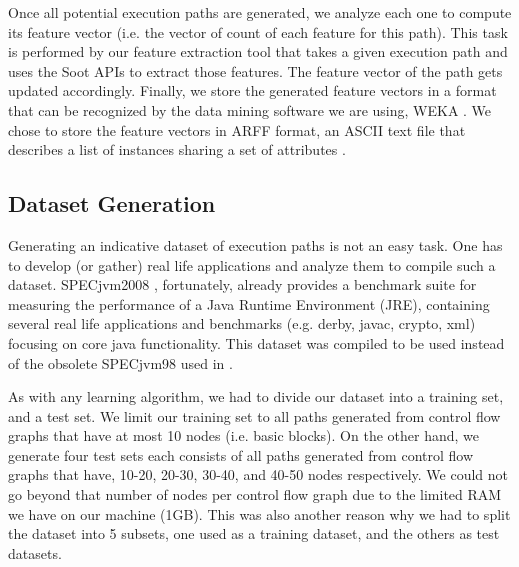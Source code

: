 \documentclass[10pt,twocolumn,letterpaper]{article}
\begin{document}
Once all potential execution paths are generated, we analyze each one to compute its feature vector (i.e. the vector of count of each feature for this path).
This task is performed by our feature extraction tool that takes a given execution path and uses the Soot \cite{vallee1999soot} APIs to extract those features.
The feature vector of the path gets updated accordingly. Finally, we store the generated feature vectors in a format that can be recognized by the data mining
software we are using, WEKA \cite{hall2009weka}. We chose to store the feature vectors in ARFF format, an ASCII text file that describes a list of instances
sharing a set of attributes \cite{arff}.

\subsection{Dataset Generation}
\label{dataset-generation}
Generating an indicative dataset of execution paths is not an easy task. One has to develop (or gather) real life applications and analyze them to compile such
a dataset. SPECjvm2008 \cite{specjvm2008}, fortunately, already provides a benchmark suite for measuring the performance of a Java Runtime Environment (JRE),
containing several real life applications and benchmarks (e.g. derby, javac, crypto, xml) focusing on core java functionality. This dataset was compiled
to be used instead of the obsolete SPECjvm98 \cite{specjvm98} used in \cite{buse2009road}.

As with any learning algorithm, we had to divide our dataset into a training set, and a test set. We limit our training set to all paths generated from control
flow graphs that have at most 10 nodes (i.e. basic blocks). On the other hand, we generate four test sets each consists of all paths generated from
control flow graphs that have, 10-20, 20-30, 30-40, and 40-50 nodes respectively. We could not go beyond that number of nodes per control flow graph due to the
limited RAM we have on our machine (1GB). This was also another reason why we had to split the dataset into 5 subsets, one used as a training dataset, and the
others as test datasets.

\begin{table}[h!]
\centering
{}
\centering
\caption{The characteristics of the datasets with the class attribute missing.}
\label{tab:no-class}
\end{table}
\end{document}
